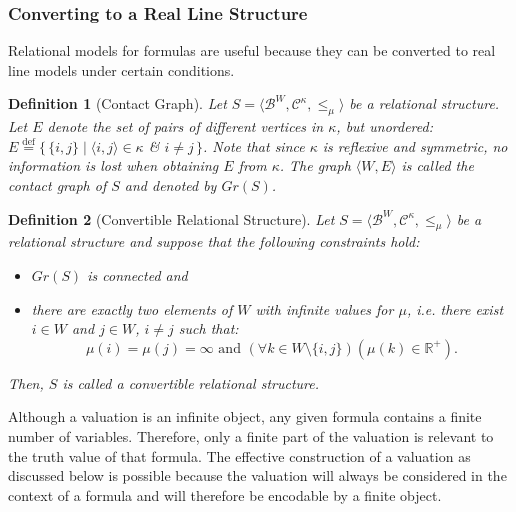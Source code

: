 \documentclass{article}
\newtheorem*{definition}{Definition}
\newcommand{\R}{\mathbb{R}}
\newcommand{\B}{\mathcal{B}}
\newcommand{\eqdef}{\stackrel{\text{def}}{=}}
\begin{document}
\subsubsection{Converting to a Real Line Structure}
Relational models for formulas are useful because they can be converted to real line models under certain conditions.
\begin{definition}[Contact Graph]
  Let $S = \langle \B^W, \mathcal{C}^\kappa, \leq_\mu \rangle$ be a relational structure. Let $E$ denote the set of pairs of different vertices in $\kappa$, but unordered: $E \eqdef \{\, \{i, j\} \mid \langle i, j \rangle \in \kappa$ \& $i \neq j \,\}$. Note that since $\kappa$ is reflexive and symmetric, no information is lost when obtaining $E$ from $\kappa$.
  The graph $\langle W, E \rangle$ is called the \emph{contact graph of $S$} and  denoted by $Gr(S)$.
\end{definition}
\begin{definition}[Convertible Relational Structure]
Let $S = \langle \B^W, \mathcal{C}^\kappa, \leq_\mu \rangle$ be a relational structure and suppose that the following constraints hold:
\begin{itemize}
\item $Gr(S)$ is connected and
\item there are exactly two elements of $W$ with infinite values for $\mu$, i.e. there exist $i \in W$ and $j \in W$, $i \neq j$ such that:
  \begin{equation*}
    \mu(i) = \mu(j) = \infty \text{ and } (\forall k \in W \setminus \{i, j\})(\mu(k) \in \R^+).
  \end{equation*}
\end{itemize}
Then, $S$ is called a \emph{convertible relational structure}.
\end{definition}

Although a valuation is an infinite object, any given formula contains a finite number of variables. Therefore, only a finite part of the valuation is relevant to the truth value of that formula. The effective construction of a valuation as discussed below is possible because the valuation will always be considered in the context of a formula and will therefore be encodable by a finite object.
\end{document}
